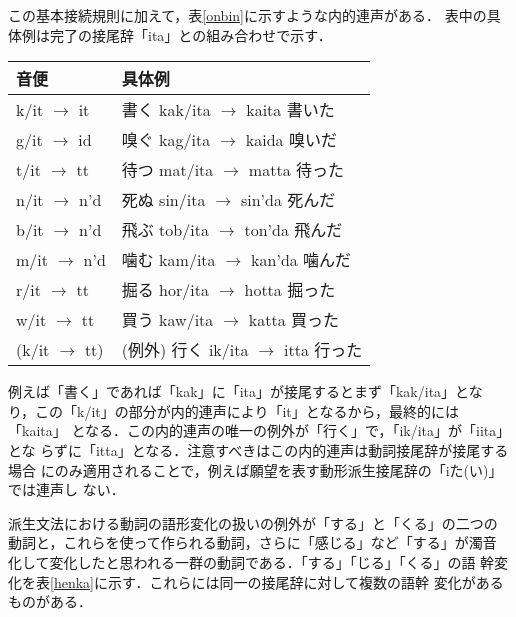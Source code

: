 この基本接続規則に加えて，表\ref{onbin}に示すような内的連声がある．
表中の具体例は完了の接尾辞「ita」との組み合わせで示す．
\begin{table*}
\begin{center}
\begin{tabular}{|l|l|} \hline
音便 & 具体例 \\ \hline
k/it $\rightarrow$ it	&	書く kak/ita $\rightarrow$ kaita 書いた \\
g/it $\rightarrow$ id	&	嗅ぐ kag/ita $\rightarrow$ kaida 嗅いだ \\
t/it $\rightarrow$ tt	&	待つ mat/ita $\rightarrow$ matta 待った \\
n/it $\rightarrow$ n'd	&	死ぬ sin/ita $\rightarrow$ sin'da 死んだ \\
b/it $\rightarrow$ n'd	&	飛ぶ tob/ita $\rightarrow$ ton'da 飛んだ \\
m/it $\rightarrow$ n'd	&	噛む kam/ita $\rightarrow$ kan'da 噛んだ \\
r/it $\rightarrow$ tt	&	掘る hor/ita $\rightarrow$ hotta 掘った \\
w/it $\rightarrow$ tt	&	買う kaw/ita $\rightarrow$ katta 買った \\
(k/it $\rightarrow$ tt) &	(例外) 行く ik/ita $\rightarrow$ itta 行った \\
\hline
\end{tabular}
\end{center}
\caption{内的連声}
\label{onbin}
\end{table*}
例えば「書く」であれば「kak」に「ita」が接尾するとまず「kak/ita」とな
り，この「k/it」の部分が内的連声により「it」となるから，最終的には「kaita」
となる．この内的連声の唯一の例外が「行く」で，「ik/ita」が「iita」とな
らずに「itta」となる．注意すべきはこの内的連声は動詞接尾辞が接尾する場合
にのみ適用されることで，例えば願望を表す動形派生接尾辞の「iた(い)」では連声し
ない．

派生文法における動詞の語形変化の扱いの例外が「する」と「くる」の二つの
動詞と，これらを使って作られる動詞，さらに「感じる」など「する」が濁音
化して変化したと思われる一群の動詞である．「する」「じる」「くる」の語
幹変化を表\ref{henka}に示す．これらには同一の接尾辞に対して複数の語幹
変化があるものがある．

